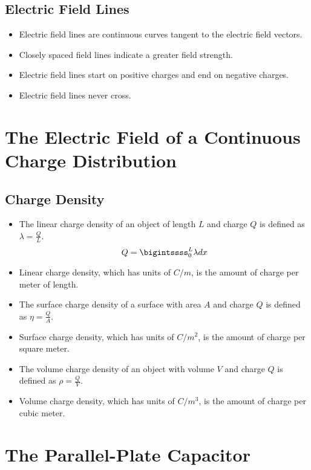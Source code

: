 \documentclass{article}
\begin{document}
\subsection*{Electric Field Lines}

\begin{itemize}
    \item Electric field lines are continuous curves tangent to the electric field vectors.
    \item Closely spaced field lines indicate a greater field strength.
    \item Electric field lines start on positive charges and end on negative charges.
    \item Electric field lines never cross.
\end{itemize}

\section*{The Electric Field of a Continuous Charge Distribution}

\subsection*{Charge Density}
\begin{itemize}
    \item The linear charge density of an object of length $L$ and charge $Q$ is defined as
    $\lambda=\frac{Q}{L}$.
    \[Q=\bigintssss_0^L\lambda dx\]
    \item Linear charge density, which has units of $C/m$, is the amount of charge per meter of
    length.
    \item The surface charge density of a surface with area $A$ and charge $Q$ is defined as
    $\eta=\frac{Q}{A}$.
    \item Surface charge density, which has units of $C/m^2$, is the amount of charge per square
    meter.
    \item The volume charge density of an object with volume $V$ and charge $Q$ is defined as
    $\rho=\frac{Q}{V}$.
    \item Volume charge density, which has units of $C/m^3$, is the amount of charge per cubic
    meter.
\end{itemize}

\section*{The Parallel-Plate Capacitor}
\end{document}
